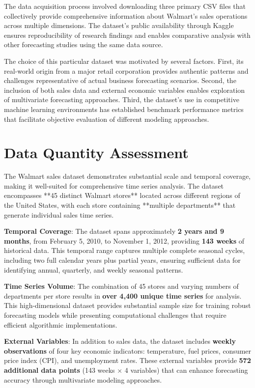 The data acquisition process involved downloading three primary CSV files that collectively provide comprehensive information about Walmart's sales operations across multiple dimensions. The dataset's public availability through Kaggle ensures reproducibility of research findings and enables comparative analysis with other forecasting studies using the same data source.

The choice of this particular dataset was motivated by several factors. First, its real-world origin from a major retail corporation provides authentic patterns and challenges representative of actual business forecasting scenarios. Second, the inclusion of both sales data and external economic variables enables exploration of multivariate forecasting approaches. Third, the dataset's use in competitive machine learning environments has established benchmark performance metrics that facilitate objective evaluation of different modeling approaches.

\section{Data Quantity Assessment}

The Walmart sales dataset demonstrates substantial scale and temporal coverage, making it well-suited for comprehensive time series analysis. The dataset encompasses **45 distinct Walmart stores** located across different regions of the United States, with each store containing **multiple departments** that generate individual sales time series.

\textbf{Temporal Coverage}: The dataset spans approximately \textbf{2 years and 9 months}, from February 5, 2010, to November 1, 2012, providing \textbf{143 weeks} of historical data. This temporal range captures multiple complete seasonal cycles, including two full calendar years plus partial years, ensuring sufficient data for identifying annual, quarterly, and weekly seasonal patterns.

\textbf{Time Series Volume}: The combination of 45 stores and varying numbers of departments per store results in \textbf{over 4,400 unique time series} for analysis. This high-dimensional dataset provides substantial sample size for training robust forecasting models while presenting computational challenges that require efficient algorithmic implementations.

\textbf{External Variables}: In addition to sales data, the dataset includes \textbf{weekly observations} of four key economic indicators: temperature, fuel prices, consumer price index (CPI), and unemployment rates. These external variables provide \textbf{572 additional data points} (143 weeks × 4 variables) that can enhance forecasting accuracy through multivariate modeling approaches.


